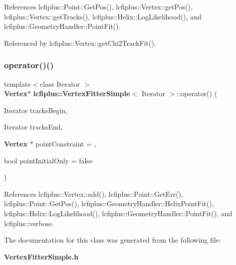 References lcfiplus\+::\+Point\+::\+Get\+Pos(), lcfiplus\+::\+Vertex\+::get\+Pos(), lcfiplus\+::\+Vertex\+::get\+Tracks(), lcfiplus\+::\+Helix\+::\+Log\+Likelihood(), and lcfiplus\+::\+Geometry\+Handler\+::\+Point\+Fit().



Referenced by lcfiplus\+::\+Vertex\+::get\+Chi2\+Track\+Fit().

\mbox{\label{classlcfiplus_1_1VertexFitterSimple_abf4bc62e8e01136aaf53ea3a25f15c34}} 
\subsubsection{operator()()}
{\footnotesize\ttfamily template$<$class Iterator $>$ \\
\textbf{ Vertex}$\ast$ \textbf{ lcfiplus\+::\+Vertex\+Fitter\+Simple}$<$ Iterator $>$\+::operator() (\begin{DoxyParamCaption}\item[{Iterator}]{tracks\+Begin,  }\item[{Iterator}]{tracks\+End,  }\item[{\textbf{ Vertex} $\ast$}]{point\+Constraint = {},  }\item[{bool}]{point\+Initial\+Only = {\ttfamily false} }\end{DoxyParamCaption})\hspace{0.3cm}{\ttfamily [inline]}}



References lcfiplus\+::\+Vertex\+::add(), lcfiplus\+::\+Point\+::\+Get\+Err(), lcfiplus\+::\+Point\+::\+Get\+Pos(), lcfiplus\+::\+Geometry\+Handler\+::\+Helix\+Point\+Fit(), lcfiplus\+::\+Helix\+::\+Log\+Likelihood(), lcfiplus\+::\+Geometry\+Handler\+::\+Point\+Fit(), and lcfiplus\+::verbose.



The documentation for this class was generated from the following file\+:\begin{DoxyCompactItemize}
\item 
\textbf{ Vertex\+Fitter\+Simple.\+h}\end{DoxyCompactItemize}
